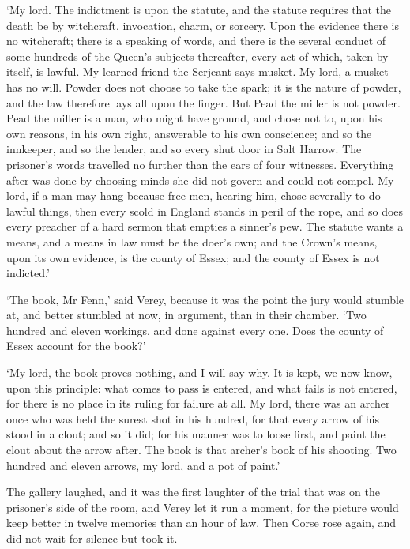 \documentclass[11pt]{article}
\begin{document}
`My lord. The indictment is upon the statute, and the statute requires that the death be by witchcraft, invocation, charm, or sorcery. Upon the evidence there is no witchcraft; there is a speaking of words, and there is the several conduct of some hundreds of the Queen's subjects thereafter, every act of which, taken by itself, is lawful. My learned friend the Serjeant says musket. My lord, a musket has no will. Powder does not choose to take the spark; it is the nature of powder, and the law therefore lays all upon the finger. But Pead the miller is not powder. Pead the miller is a man, who might have ground, and chose not to, upon his own reasons, in his own right, answerable to his own conscience; and so the innkeeper, and so the lender, and so every shut door in Salt Harrow. The prisoner's words travelled no further than the ears of four witnesses. Everything after was done by choosing minds she did not govern and could not compel. My lord, if a man may hang because free men, hearing him, chose severally to do lawful things, then every scold in England stands in peril of the rope, and so does every preacher of a hard sermon that empties a sinner's pew. The statute wants a means, and a means in law must be the doer's own; and the Crown's means, upon its own evidence, is the county of Essex; and the county of Essex is not indicted.'

`The book, Mr Fenn,' said Verey, because it was the point the jury would stumble at, and better stumbled at now, in argument, than in their chamber. `Two hundred and eleven workings, and done against every one. Does the county of Essex account for the book?'

`My lord, the book proves nothing, and I will say why. It is kept, we now know, upon this principle: what comes to pass is entered, and what fails is not entered, for there is no place in its ruling for failure at all. My lord, there was an archer once who was held the surest shot in his hundred, for that every arrow of his stood in a clout; and so it did; for his manner was to loose first, and paint the clout about the arrow after. The book is that archer's book of his shooting. Two hundred and eleven arrows, my lord, and a pot of paint.'

The gallery laughed, and it was the first laughter of the trial that was on the prisoner's side of the room, and Verey let it run a moment, for the picture would keep better in twelve memories than an hour of law. Then Corse rose again, and did not wait for silence but took it.
\end{document}
